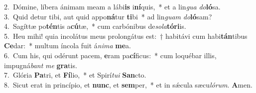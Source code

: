 {2.~}Dómine, líbera ánimam meam a lábi\textbf{is} i\textbf{ní}quis,~* et a lin\textit{gua} \textit{do}\textbf{ló}sa.\\
{3.~}Quid detur tibi, aut quid appo\textbf{ná}tur \textbf{ti}bi~* ad lin\textit{guam} \textit{do}\textbf{ló}sam?\\
{4.~}Sagíttæ po\textbf{tén}tis a\textbf{cú}tæ,~* cum carbónibus de\textit{so}\textit{la}\textbf{tó}\textbf{ri}is.\\
{5.~}Heu mihi! quia incolátus meus prolongátus est:~† habitávi cum habi\textbf{tán}tibus \textbf{Ce}dar:~* multum íncola fuit á\textit{ni}\textit{ma} \textbf{me}a.\\
{6.~}Cum his, qui odérunt pacem, \textbf{e}ram pa\textbf{cí}ficus:~* cum loquébar illis, impugná\textit{bant} \textit{me} \textbf{gra}tis.\\
{7.~}Glória \textbf{Pa}tri, et \textbf{Fí}lio,~* et Spirí\textit{tu}\textit{i} \textbf{San}cto.\\
{8.~}Sicut erat in princípio, et \textbf{nunc}, et \textbf{sem}per,~* et in sǽcula sæcu\textit{ló}\textit{rum}. \textbf{A}men.\\

